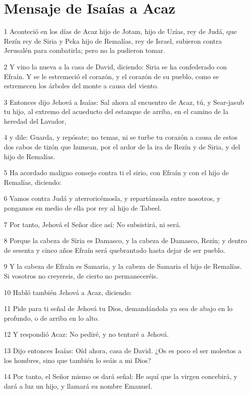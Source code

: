 \section*{Mensaje de Isaías a Acaz}

\par 1 Aconteció en los días de Acaz hijo de Jotam, hijo de Uzías, rey de Judá, que Rezín rey de Siria y Peka hijo de Remalías, rey de Israel, subieron contra Jerusalén para combatirla; pero no la pudieron tomar. 
\par 2 Y vino la nueva a la casa de David, diciendo: Siria se ha confederado con Efraín. Y se le estremeció el corazón, y el corazón de su pueblo, como se estremecen los árboles del monte a causa del viento.
\par 3 Entonces dijo Jehová a Isaías: Sal ahora al encuentro de Acaz, tú, y Sear-jasub tu hijo, al extremo del acueducto del estanque de arriba, en el camino de la heredad del Lavador,
\par 4 y dile: Guarda, y repósate; no temas, ni se turbe tu corazón a causa de estos dos cabos de tizón que humean, por el ardor de la ira de Rezín y de Siria, y del hijo de Remalías.
\par 5 Ha acordado maligno consejo contra ti el sirio, con Efraín y con el hijo de Remalías, diciendo:
\par 6 Vamos contra Judá y aterroricémosla, y repartámosla entre nosotros, y pongamos en medio de ella por rey al hijo de Tabeel.
\par 7 Por tanto, Jehová el Señor dice así: No subsistirá, ni será.
\par 8 Porque la cabeza de Siria es Damasco, y la cabeza de Damasco, Rezín; y dentro de sesenta y cinco años Efraín será quebrantado hasta dejar de ser pueblo.
\par 9 Y la cabeza de Efraín es Samaria, y la cabeza de Samaria el hijo de Remalías. Si vosotros no creyereis, de cierto no permaneceréis.
\par 10 Habló también Jehová a Acaz, diciendo:
\par 11 Pide para ti señal de Jehová tu Dios, demandándola ya sea de abajo en lo profundo, o de arriba en lo alto.
\par 12 Y respondió Acaz: No pediré, y no tentaré a Jehová.
\par 13 Dijo entonces Isaías: Oíd ahora, casa de David. ¿Os es poco el ser molestos a los hombres, sino que también lo seáis a mi Dios?
\par 14 Por tanto, el Señor mismo os dará señal: He aquí que la virgen concebirá, y dará a luz un hijo, y llamará su nombre Emanuel.

